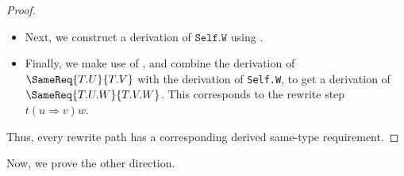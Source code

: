 \documentclass[../generics]{subfiles}
\begin{document}
\begin{proof}
\begin{itemize}
We introduce this requirement using a \textsc{ReqSig} derivation step, and combine it with the derivation of $\ConfReq{T}{P}$ using a \textsc{Conf} step, to get a derivation of $\SameReq{T.U}{T.V}$ or $\SameReq{T.V}{T.U}$.

If the requirement has the form $\SameReq{T.V}{T.U}$, we also add an \textsc{Equiv} step, flipping it around to get $\SameReq{T.U}{T.V}$. We now have a derivation corresponding to the rewrite step $t(u\Rightarrow v)$.

\item Next, we construct a derivation of $\texttt{Self.W}$  using .
\item Finally, we make use of , and combine the derivation of $\SameReq{T.U}{T.V}$ with the derivation of \texttt{Self.W}, to get a derivation of $\SameReq{T.U.W}{T.V.W}$. This corresponds to the rewrite step $t(u\Rightarrow v)w$.
\end{itemize}
Thus, every rewrite path has a corresponding derived same-type requirement.
\end{proof}

Now, we prove the other direction.
\end{document}
